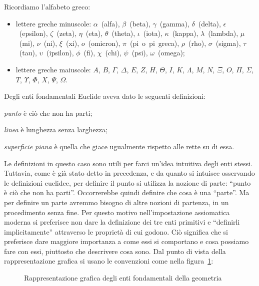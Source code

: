 Ricordiamo l'alfabeto greco:
\begin{itemize}
\item lettere greche minuscole:  $\alpha$~(alfa),  $\beta$~(beta),  $\gamma$~(gamma),  $\delta$~(delta), $\epsilon$~(epsilon), $\zeta$~(zeta), $\eta$~(eta), $\theta$~(theta),  $\iota$~(iota),  $\kappa$~(kappa), $\lambda$~(lambda), $\mu$~(mi), $\nu$~(ni),  $\xi$~(xi), $o$~(omicron), $\pi$~(pi~o~pi~greca), $\rho$~(rho), $\sigma$~(sigma), $\tau$~(tau), $\upsilon$~(ipsilon), $\phi$~(fi), $\chi$~(chi), $\psi$~(psi), $\omega$~(omega);
\item lettere greche maiuscole: $A$, $B$, $ \Gamma $, $ \Delta $, $ E $, $ Z $, $ H $, $ \Theta $, $ I $, $ K $, $ \Lambda $, $ M $, $ N $, $ \Xi $, $ O $, $ \Pi $, $ \Sigma $, $ T $, $ \Upsilon $, $ \Phi $, $ X $, $ \Psi $, $\Omega $.
\end{itemize}

Degli enti fondamentali Euclide aveva dato le seguenti definizioni:
\begin{itemize*}
\item \emph{punto} è ciò che non ha parti;
\item \emph{linea} è lunghezza senza larghezza;
\item \emph{superficie piana} è quella che giace ugualmente rispetto alle rette su di essa.
\end{itemize*}
Le definizioni in questo caso sono utili per farci un'idea intuitiva degli enti stessi. Tuttavia, come è già stato detto in precedenza, e da quanto si intuisce osservando le definizioni euclidee, per definire il punto si utilizza la nozione di parte: ``punto è ciò che non ha parti''. Occorrerebbe quindi definire che cosa è una ``parte''. Ma per definire un parte avremmo bisogno di altre nozioni di partenza, in un procedimento senza fine. Per questo motivo nell'impostazione assiomatica moderna si preferisce non dare la definizione dei tre enti primitivi e ``definirli implicitamente'' attraverso le proprietà di cui godono. Ciò significa che si preferisce dare maggiore importanza a come essi si comportano e cosa possiamo fare con essi, piuttosto che descrivere cosa sono.
Dal punto di vista della rappresentazione grafica si usano le convenzioni come nella figura~\ref{fig:1.2}:
% 
\begin{figure}[htb]
 \centering
 \caption{Rappresentazione grafica degli enti fondamentali della geometria}\label{fig:1.2}
\end{figure}

